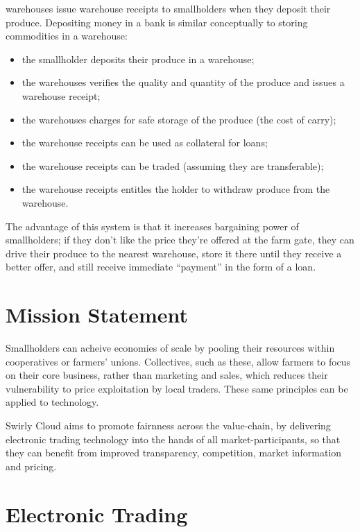 \documentclass[11pt,a4paper]{article}
\newcommand{\scorg}{Swirly Cloud\cite{swirlycloud:github}}
\begin{document}
\Glspl{warehouse} issue \glspl{warehouse receipt} to smallholders when they deposit their produce.
Depositing money in a bank is similar conceptually to storing commodities in a \gls{warehouse}:

\begin{itemize}
\item the smallholder deposits their produce in a \gls{warehouse};
\item the \glspl{warehouse} verifies the quality and quantity of the produce and issues a
  \gls{warehouse receipt};
\item the \glspl{warehouse} charges for safe storage of the produce (the cost of carry);
\item the \glspl{warehouse receipt} can be used as collateral for loans;
\item the \glspl{warehouse receipt} can be traded (assuming they are transferable);
\item the \glspl{warehouse receipt} entitles the holder to withdraw produce from the \gls{warehouse}.
\end{itemize}

The advantage of this system is that it increases bargaining power of smallholders; if they don't
like the price they're offered at the farm gate, they can drive their produce to the nearest
\gls{warehouse}, store it there until they receive a better offer, and still receive immediate
``payment'' in the form of a loan.

\section{Mission Statement}

Smallholders can acheive economies of scale by pooling their resources within cooperatives or
farmers' unions. Collectives, such as these, allow farmers to focus on their core business, rather
than marketing and sales, which reduces their vulnerability to price exploitation by local
traders. These same principles can be applied to technology.

\scorg{} aims to promote fairnness across the value-chain, by delivering electronic trading
technology into the hands of all \gls{market}-participants, so that they can benefit from improved
transparency, competition, \gls{market} information and pricing.

\section{Electronic Trading}
\end{document}
